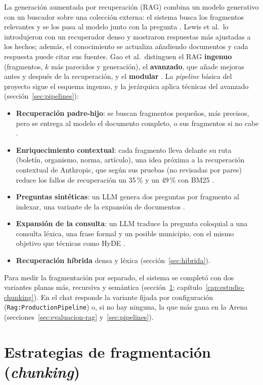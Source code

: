 La generación aumentada por recuperación (RAG) combina un modelo generativo con un buscador sobre una colección externa: el sistema busca los fragmentos relevantes y se los pasa al modelo junto con la pregunta \cite{lewis2020}. Lewis et al.\ lo introdujeron con un recuperador denso \cite{karpukhin2020} y mostraron respuestas más ajustadas a los hechos; además, el conocimiento se actualiza añadiendo documentos y cada respuesta puede citar sus fuentes. Gao et al.\ distinguen el RAG \textbf{ingenuo} (fragmentos, $k$ más parecidos y generación), el \textbf{avanzado}, que añade mejoras antes y después de la recuperación, y el \textbf{modular} \cite{gao2023}. La \emph{pipeline} básica del proyecto sigue el esquema ingenuo, y la jerárquica aplica técnicas del avanzado (sección~\ref{sec:pipelines}):
\begin{itemize}
  \item \textbf{Recuperación padre-hijo}: se buscan fragmentos pequeños, más precisos, pero se entrega al modelo el documento completo, o sus fragmentos si no cabe \cite{gao2023}.
  \item \textbf{Enriquecimiento contextual}: cada fragmento lleva delante su ruta (boletín, organismo, norma, artículo), una idea próxima a la recuperación contextual de Anthropic, que según sus pruebas (no revisadas por pares) reduce los fallos de recuperación un 35\,\% y un 49\,\% con BM25 \cite{anthropic2024contextual}.
  \item \textbf{Preguntas sintéticas}: un LLM genera dos preguntas por fragmento al indexar, una variante de la expansión de documentos \cite{nogueira2019doc2query}.
  \item \textbf{Expansión de la consulta}: un LLM traduce la pregunta coloquial a una consulta léxica, una frase formal y un posible municipio, con el mismo objetivo que técnicas como HyDE \cite{gao2023hyde}.
  \item \textbf{Recuperación híbrida} densa y léxica (sección~\ref{sec:hibrida}).
\end{itemize}
Para medir la fragmentación por separado, el sistema se completó con dos variantes planas más, recursiva y semántica (sección~\ref{sec:chunking}; capítulo~\ref{cap:estudio-chunking}). En el chat responde la variante fijada por configuración (\texttt{Rag:ProductionPipeline}) o, si no hay ninguna, la que más gana en la Arena (secciones~\ref{sec:evaluacion-rag} y~\ref{sec:pipelines}).

\section{Estrategias de fragmentación (\emph{chunking})}
\label{sec:chunking}

